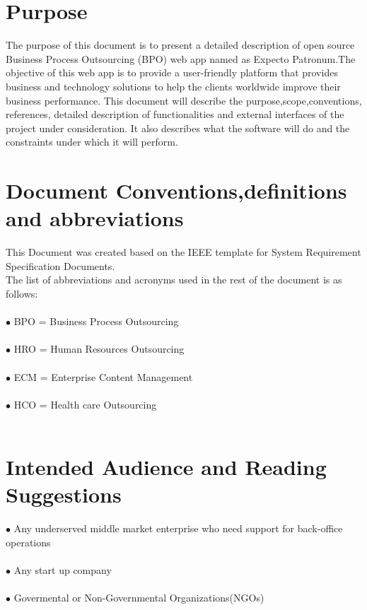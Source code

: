 \documentclass{scrreprt}
\begin{document}
\section{Purpose}
The purpose of this document is to present a detailed description of open source Business Process Outsourcing (BPO) web app
named as Expecto Patronum.The objective of this web app
is to provide a user-friendly platform that provides business and technology solutions to help the clients
worldwide improve their business performance. This document 
will describe the purpose,scope,conventions, references, detailed description of functionalities and external interfaces of the project under consideration. It also describes 
what the software will do and the constraints under which it will perform.


\section{Document Conventions,definitions and abbreviations}
This Document was created based on the IEEE template for System Requirement
Specification Documents.\\
The list of abbreviations and acronyms used in the rest of the document is as follows:\\\\
$\bullet$ BPO = Business Process Outsourcing\\\\
$\bullet$ HRO = Human Resources Outsourcing\\\\
$\bullet$ ECM = Enterprise Content Management\\\\
$\bullet$ HCO = Health care Outsourcing\\\\
\section{Intended Audience and Reading Suggestions}
$\bullet$ Any underserved middle market enterprise who need support for back-office operations\\\\
$\bullet$ Any start up company\\\\
$\bullet$ Govermental or Non-Governmental Organizations(NGOs)\\\\
\end{document}
